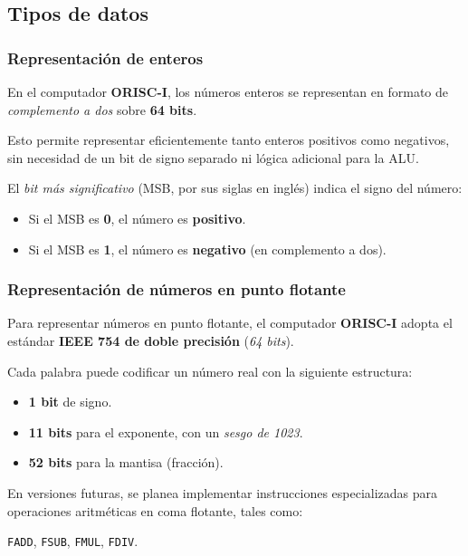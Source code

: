 \documentclass{article}
\begin{document}
\subsection{Tipos de datos}

\subsubsection{Representación de enteros}

En el computador \textbf{ORISC-I}, los números enteros se representan en formato de \textit{complemento a dos} sobre \textbf{64 bits}. 

Esto permite representar eficientemente tanto enteros positivos como negativos, sin necesidad de un bit de signo separado ni lógica adicional para la ALU.

El \textit{bit más significativo} (MSB, por sus siglas en inglés) indica el signo del número:

\begin{itemize}
    \item Si el MSB es \textbf{0}, el número es \textbf{positivo}.
    \item Si el MSB es \textbf{1}, el número es \textbf{negativo} (en complemento a dos).
\end{itemize}

\subsubsection{Representación de números en punto flotante}

Para representar números en punto flotante, el computador \textbf{ORISC-I} adopta el estándar \textbf{IEEE 754 de doble precisión} (\textit{64 bits}).

Cada palabra puede codificar un número real con la siguiente estructura:

\begin{itemize}
    \item \textbf{1 bit} de signo.
    \item \textbf{11 bits} para el exponente, con un \textit{sesgo de 1023}.
    \item \textbf{52 bits} para la mantisa (fracción).
\end{itemize}

En versiones futuras, se planea implementar instrucciones especializadas para operaciones aritméticas en coma flotante, tales como:

\texttt{FADD}, \texttt{FSUB}, \texttt{FMUL}, \texttt{FDIV}.
\end{document}

